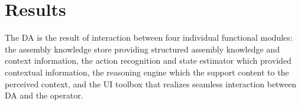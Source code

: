 \section{Results}\label{sec:Results}

The DA is the result of interaction between four individual functional modules: the assembly knowledge store providing structured assembly knowledge and context information, the action recognition and state estimator which provided contextual information, the reasoning engine which the support content to the perceived context, and the UI toolbox that realizes seamless interaction between DA and the operator.





